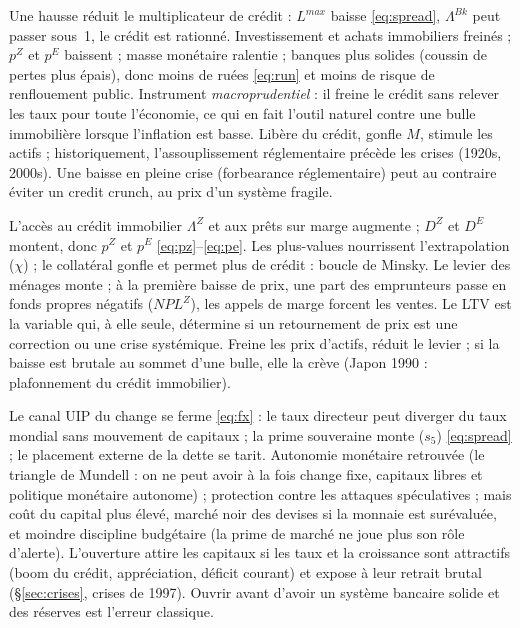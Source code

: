 \documentclass[11pt,a4paper]{article}
\begin{document}
\direct Une hausse réduit le multiplicateur de crédit : $L^{max}$ baisse \eqref{eq:spread}, $\Lambda^{Bk}$ peut passer sous~1, le crédit est rationné.
\second Investissement et achats immobiliers freinés ; $p^Z$ et $p^E$ baissent ; masse monétaire ralentie ; banques plus solides (coussin de pertes plus épais), donc moins de ruées \eqref{eq:run} et moins de risque de renflouement public. Instrument \emph{macroprudentiel} : il freine le crédit sans relever les taux pour toute l'économie, ce qui en fait l'outil naturel contre une bulle immobilière lorsque l'inflation est basse.
\baisse Libère du crédit, gonfle $M$, stimule les actifs ; historiquement, l'assouplissement réglementaire précède les crises (1920s, 2000s). Une baisse en pleine crise (forbearance réglementaire) peut au contraire éviter un credit crunch, au prix d'un système fragile.

\direct L'accès au crédit immobilier $\Lambda^Z$ et aux prêts sur marge augmente ; $D^Z$ et $D^E$ montent, donc $p^Z$ et $p^E$ \eqref{eq:pz}--\eqref{eq:pe}.
\second Les plus-values nourrissent l'extrapolation ($\chi$) ; le collatéral gonfle et permet plus de crédit : boucle de Minsky. Le levier des ménages monte ; à la première baisse de prix, une part des emprunteurs passe en fonds propres négatifs ($NPL^Z$), les appels de marge forcent les ventes. Le LTV est la variable qui, à elle seule, détermine si un retournement de prix est une correction ou une crise systémique.
\baisse Freine les prix d'actifs, réduit le levier ; si la baisse est brutale au sommet d'une bulle, elle la crève (Japon 1990 : plafonnement du crédit immobilier).

\direct Le canal UIP du change se ferme \eqref{eq:fx} : le taux directeur peut diverger du taux mondial sans mouvement de capitaux ; la prime souveraine monte ($s_5$) \eqref{eq:spread} ; le placement externe de la dette se tarit.
\second Autonomie monétaire retrouvée (le triangle de Mundell : on ne peut avoir à la fois change fixe, capitaux libres et politique monétaire autonome) ; protection contre les attaques spéculatives ; mais coût du capital plus élevé, marché noir des devises si la monnaie est surévaluée, et moindre discipline budgétaire (la prime de marché ne joue plus son rôle d'alerte).
\baisse L'ouverture attire les capitaux si les taux et la croissance sont attractifs (boom du crédit, appréciation, déficit courant) et expose à leur retrait brutal (\S\ref{sec:crises}, crises de 1997). Ouvrir avant d'avoir un système bancaire solide et des réserves est l'erreur classique.
\end{document}
